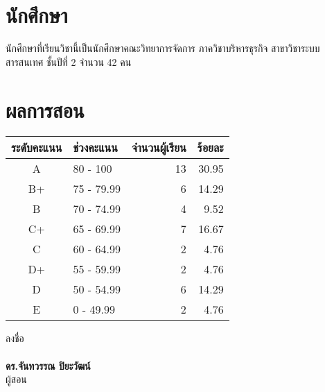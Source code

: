 \makeatletter
\renewcommand{\chapter}{\@gobbletwo}

\makeatother

\section*{นักศึกษา}

นักศึกษาที่เรียนวิชานี้เป็นนักศึกษาคณะวิทยาการจัดการ ภาควิชาบริหารธุรกิจ สาขาวิชาระบบสารสนเทศ ชั้นปีที่ 2 จำนวน 42 คน

\section*{ผลการสอน}

\begin{table}[H]
\centering
\begin{tabu}{c l r r}
 \hline
 ระดับคะแนน & ช่วงคะแนน & จำนวนผู้เรียน & ร้อยละ \\ [0.5ex] 
 \hline
A & 80 - 100 & 13 & 30.95 \\
B+  & 75 - 79.99  & 6 & 14.29 \\
B  & 70 - 74.99  & 4 & 9.52 \\
C+ & 65 - 69.99 & 7 & 16.67 \\
C  & 60 - 64.99 & 2 & 4.76 \\
D+  & 55 - 59.99 & 2 & 4.76 \\
D  & 50 - 54.99 & 6 & 14.29 \\
E  & 0 - 49.99 & 2 & 4.76 \\
\hline
\end{tabu}
\end{table}


\vspace{10mm}
\noindent
\hangindent=9cm
ลงชื่อ\\
\vspace{10mm}\\
\textbf{ดร.จันทวรรณ ปิยะวัฒน์}\\
ผู้สอน



